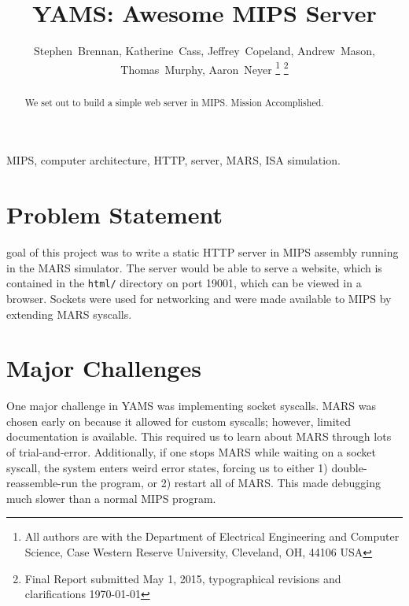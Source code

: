 \documentclass[journal,10pt]{IEEEtran}
\begin{document}
\title{YAMS: Awesome MIPS Server}

\author{
Stephen~Brennan,
Katherine~Cass,
Jeffrey~Copeland,
Andrew~Mason,
Thomas~Murphy,
Aaron~Neyer%
\thanks{All authors are with the Department of Electrical Engineering and Computer Science, Case Western Reserve University, Cleveland, OH, 44106 USA}%
\thanks{Final Report submitted May 1, 2015, typographical revisions and clarifications \today}
} %


%
{}

\maketitle

\begin{abstract}
We set out to build a simple web server in MIPS. Mission Accomplished.
\end{abstract}

\begin{IEEEkeywords}
MIPS, computer architecture, HTTP, server, MARS, ISA simulation.
\end{IEEEkeywords}


\section{Problem Statement}

 goal of this project was to write a static HTTP server in
MIPS assembly running in the MARS simulator. The server would be able to serve a
website, which is contained in the \texttt{html/} directory on port 19001, which
can be viewed in a browser. Sockets were used for networking and were made
available to MIPS by extending MARS syscalls.


\section{Major Challenges}

One major challenge in YAMS was implementing socket syscalls.
MARS was chosen early on because it allowed for custom syscalls; however,
limited documentation is available. This required us to learn about MARS
through lots of trial-and-error. Additionally, if one stops MARS while
waiting on a socket syscall, the system enters weird error states, forcing
us to either 1) double-reassemble-run the program, or 2) restart all of MARS.
This made debugging much slower than a normal MIPS program.
\end{document}

